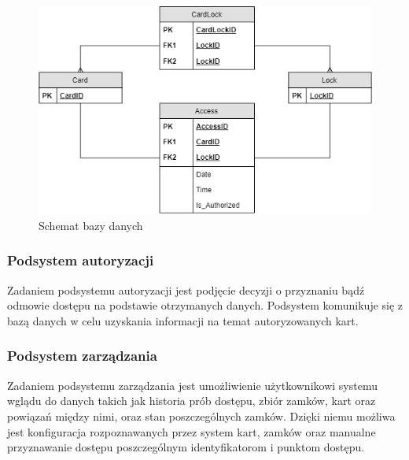                                 \begin{figure}
                                        \includegraphics[width=\linewidth]{chapters/images/schema.png}
                                        \caption{Schemat bazy danych}
                                        \label{fig:schema}
                                \end{figure}

                        \subsubsection{Podsystem autoryzacji}
                                Zadaniem podsystemu autoryzacji jest podjęcie decyzji o przyznaniu bądź odmowie dostępu na podstawie otrzymanych danych. Podsystem komunikuje się z bazą danych w celu uzyskania informacji na temat autoryzowanych kart.

                        \subsubsection{Podsystem zarządzania}
                                Zadaniem podsystemu zarządzania jest umożliwienie użytkownikowi systemu wglądu do danych takich jak historia prób dostępu, zbiór zamków, kart oraz powiązań między nimi, oraz stan poszczególnych zamków. Dzięki niemu możliwa jest konfiguracja rozpoznawanych przez system kart, zamków oraz manualne przyznawanie dostępu poszczególnym identyfikatorom i punktom dostępu.

